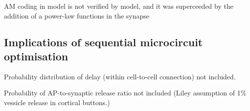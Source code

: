 AM coding in model is not verified by \citet{ZilanyBruce:2006} model,
and it was superceeded by the addition of a power-law functions in the
synapse \citep{ZilanyBruceEtAl:2009}

\subsection{Implications of sequential microcircuit optimisation}



Probability distribution of delay (within cell-to-cell connection) not included.

\medskip{}

Probability of AP-to-synaptic release ratio not included (Liley assumption of 1\% vessicle release in cortical buttons.) 

